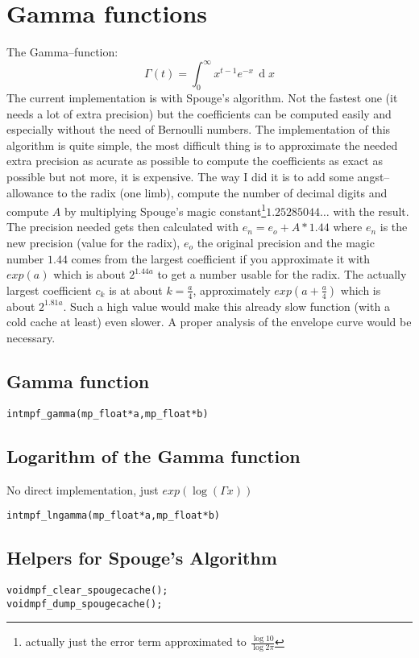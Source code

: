 \documentclass[a4paper]{book}
\theoremstyle{definition}
\theoremstyle{remark}
\DeclareMathOperator{\D}{d}
\begin{document}
\section{Gamma functions}
The Gamma--function:
\begin{equation}
\Gamma(t) = \int_0^\infty  x^{t-1} e^{-x}\,\D x
\end{equation}
The current implementation is with Spouge's algorithm\cite{spouge1994computation}. Not the fastest one (it needs a lot of extra precision) but the coefficients can be computed easily and especially without the need of Bernoulli numbers. The implementation of this algorithm is quite simple, the most difficult thing is to approximate the needed extra precision as acurate as possible to compute the coefficients as exact as possible but not more, it is expensive. The way I did it is to add some angst--allowance to the radix (one limb), compute the number of decimal digits and compute $A$ by multiplying Spouge's magic constant\footnote{actually just the error term approximated to  $\frac{\log 10}{\log 2\pi}$}$1.25285044\ldots$ with the result. The precision needed gets then calculated with $e_n = e_o + A * 1.44$ where $e_n$ is the new precision (value for the radix), $e_o$ the original precision and the magic number $1.44$ comes from the largest coefficient if you approximate it with $exp(a)$ which is about $2^{1.44 a}$ to get a number usable for the radix. The actually largest coefficient $c_k$ is at about $k = \tfrac{a}{4}$, approximately $exp(a + \tfrac{a}{4})$ which is about $2^{1.81 a}$. Such a high value would make this already slow function (with a cold cache at least) even slower. A proper analysis of the envelope curve would be necessary.

\subsection{Gamma function}
\begin{alltt}
int  mpf_gamma(mp_float * a, mp_float * b)
\end{alltt}
\subsection{Logarithm of the Gamma function}
No direct implementation, just $exp\left(\log\left(\Gamma x\right)\right)$
\begin{alltt}
int  mpf_lngamma(mp_float * a, mp_float * b)
\end{alltt}
\subsection{Helpers for Spouge's Algorithm}
\begin{alltt}
void mpf_clear_spougecache();
void mpf_dump_spougecache();
\end{alltt}
\end{document}
